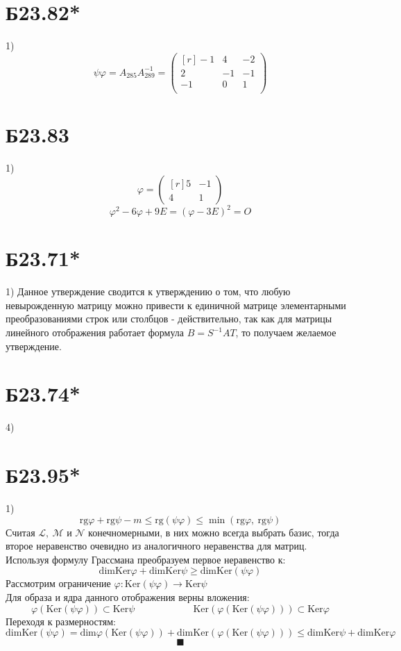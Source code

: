 \documentclass[a4paper,12pt]{article} %
\begin{document}
\section*{Б23.82*}1) $$\psi\varphi=A_{285}A^{-1}_{289}=\begin{pmatrix*}[r]
    -1&4&-2\\
    2&-1&-1\\
    -1&0&1\\
\end{pmatrix*}$$
\section*{Б23.83}1)$$\varphi=\begin{pmatrix*}[r]
    5&-1\\
    4&1
\end{pmatrix*}$$
$$\varphi^2-6\varphi+9E=(\varphi-3E)^2=O$$
\section*{Б23.71*}1) Данное утверждение сводится к утверждению о том, что любую невырожденную матрицу можно привести к единичной матрице элементарными преобразованиями строк или столбцов - действительно, так как для матрицы линейного отображения работает формула $B=S^{-1}AT$, то получаем желаемое утверждение.
\section*{Б23.74*}4)
\section*{Б23.95*}1)$$\mathrm{rg}\varphi+\mathrm{rg}\psi-m\le\mathrm{rg}(\psi\varphi)\le\min(\mathrm{rg}\varphi,\ \mathrm{rg}\psi)$$
Считая $\mathcal{L},\ \mathcal{M}$ и $\mathcal{N}$ конечномерными, в них можно всегда выбрать базис, тогда второе неравенство очевидно из аналогичного неравенства для матриц.\\
Используя формулу Грассмана преобразуем первое неравенство к:
$$\mathrm{dim}\mathrm{Ker}\varphi+\mathrm{dim}\mathrm{Ker}\psi\ge\mathrm{dim}\mathrm{Ker}(\psi\varphi)$$
Рассмотрим ограничение $\varphi:\mathrm{Ker}(\psi\varphi)\to\mathrm{Ker}\psi$\\
Для образа и ядра данного отображения верны вложения:
$$\varphi\left(\mathrm{Ker}(\psi\varphi)\right)\subset\mathrm{Ker}\psi\qquad\qquad\qquad\mathrm{Ker}\left(\varphi\left(\mathrm{Ker}(\psi\varphi)\right)\right)\subset\mathrm{Ker}\varphi$$
Переходя к размерностям:
$$\mathrm{dim}\mathrm{Ker}(\psi\varphi)=\mathrm{dim}\varphi\left(\mathrm{Ker}(\psi\varphi)\right)+\mathrm{dim}\mathrm{Ker}\left(\varphi\left(\mathrm{Ker}(\psi\varphi)\right)\right)\le\mathrm{dim}\mathrm{Ker}\psi+\mathrm{dim}\mathrm{Ker}\varphi$$
$$\blacksquare$$
\end{document}
